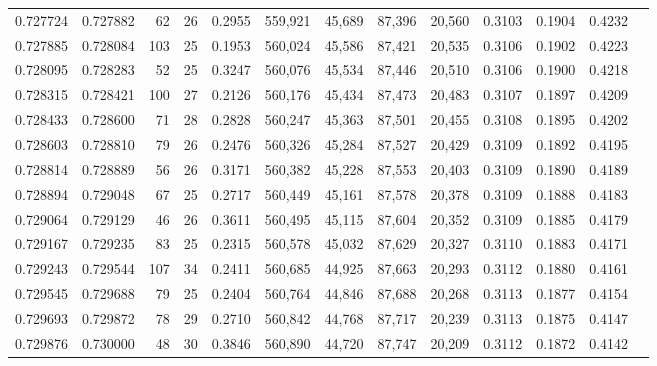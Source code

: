 \begin{tabular}{rrrrrrrrrrrrr}
0.727724 & 0.727882 &     62 &    26 &                                     0.2955 & 559,921 &  45,689 &  87,396 &  20,560 & 0.3103 & 0.1904 & 0.4232 \\
0.727885 & 0.728084 &    103 &    25 &                                     0.1953 & 560,024 &  45,586 &  87,421 &  20,535 & 0.3106 & 0.1902 & 0.4223 \\
0.728095 & 0.728283 &     52 &    25 &                                     0.3247 & 560,076 &  45,534 &  87,446 &  20,510 & 0.3106 & 0.1900 & 0.4218 \\
0.728315 & 0.728421 &    100 &    27 &                                     0.2126 & 560,176 &  45,434 &  87,473 &  20,483 & 0.3107 & 0.1897 & 0.4209 \\
0.728433 & 0.728600 &     71 &    28 &                                     0.2828 & 560,247 &  45,363 &  87,501 &  20,455 & 0.3108 & 0.1895 & 0.4202 \\
0.728603 & 0.728810 &     79 &    26 &                                     0.2476 & 560,326 &  45,284 &  87,527 &  20,429 & 0.3109 & 0.1892 & 0.4195 \\
0.728814 & 0.728889 &     56 &    26 &                                     0.3171 & 560,382 &  45,228 &  87,553 &  20,403 & 0.3109 & 0.1890 & 0.4189 \\
0.728894 & 0.729048 &     67 &    25 &                                     0.2717 & 560,449 &  45,161 &  87,578 &  20,378 & 0.3109 & 0.1888 & 0.4183 \\
0.729064 & 0.729129 &     46 &    26 &                                     0.3611 & 560,495 &  45,115 &  87,604 &  20,352 & 0.3109 & 0.1885 & 0.4179 \\
0.729167 & 0.729235 &     83 &    25 &                                     0.2315 & 560,578 &  45,032 &  87,629 &  20,327 & 0.3110 & 0.1883 & 0.4171 \\
0.729243 & 0.729544 &    107 &    34 &                                     0.2411 & 560,685 &  44,925 &  87,663 &  20,293 & 0.3112 & 0.1880 & 0.4161 \\
0.729545 & 0.729688 &     79 &    25 &                                     0.2404 & 560,764 &  44,846 &  87,688 &  20,268 & 0.3113 & 0.1877 & 0.4154 \\
0.729693 & 0.729872 &     78 &    29 &                                     0.2710 & 560,842 &  44,768 &  87,717 &  20,239 & 0.3113 & 0.1875 & 0.4147 \\
0.729876 & 0.730000 &     48 &    30 &                                     0.3846 & 560,890 &  44,720 &  87,747 &  20,209 & 0.3112 & 0.1872 & 0.4142 \\

\end{tabular}
